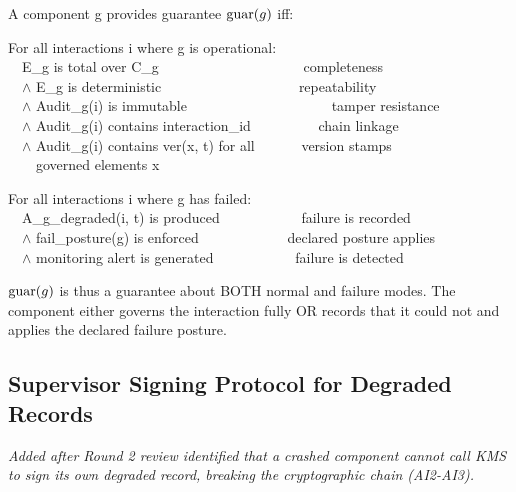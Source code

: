 \begin{cdef}
A component g provides guarantee $\operatorname{guar}(g)$ iff:

\begin{cladnote}
For all interactions i where g is operational:\\
~~E\_g is total over C\_g~~~~~~~~~~~~~~~~~~~~\textemdash{} completeness\\
~~$\wedge$ E\_g is deterministic~~~~~~~~~~~~~~~~~~~\textemdash{} repeatability\\
~~$\wedge$ Audit\_g(i) is immutable~~~~~~~~~~~~~~~~~~~~\textemdash{} tamper resistance\\
~~$\wedge$ Audit\_g(i) contains interaction\_id~~~~~~~~~\textemdash{} chain linkage\\
~~$\wedge$ Audit\_g(i) contains ver(x, t) for all~~~~~~\textemdash{} version stamps\\
~~~~governed elements x\\
\end{cladnote}
\begin{cladnote}
For all interactions i where g has failed:\\
~~A\_g\_degraded(i, t) is produced~~~~~~~~~~~\textemdash{} failure is recorded\\
~~$\wedge$ fail\_posture(g) is enforced~~~~~~~~~~~~\textemdash{} declared posture applies\\
~~$\wedge$ monitoring alert is generated~~~~~~~~~~~\textemdash{} failure is detected\\
\end{cladnote}
$\operatorname{guar}(g)$ is thus a guarantee about BOTH normal and failure modes.
The component either governs the interaction fully OR records that it could not and applies the declared failure posture.

\end{cdef}


\subsection{Supervisor Signing Protocol for Degraded Records}


\emph{Added after Round 2 review identified that a crashed component cannot call KMS to sign its own degraded record, breaking the cryptographic chain (AI2-AI3).}


